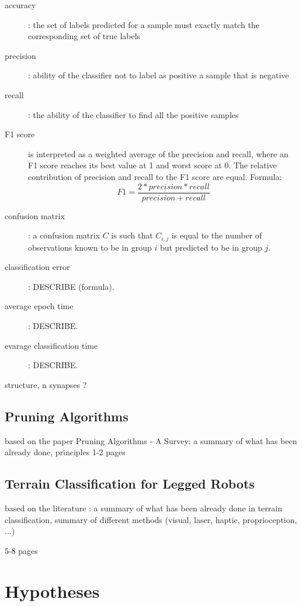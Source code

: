 \begin{description}
\item[accuracy] : the set of labels predicted for a sample must exactly match the corresponding set of true labels
\item[precision] : ability of the classifier not to label as positive a sample that is negative
\item[recall] : the ability of the classifier to find all the positive samples
\item[F1 score] is interpreted as a weighted average of the precision and recall, where an F1 score reaches its best value at 1 and worst score at 0. The relative contribution of precision and recall to the F1 score are equal. Formula:
\begin{equation} \label{eq:f1_score}
F1 = \frac{2 * precision * recall}{precision + recall}
\end{equation}
\item[confusion matrix] : a confusion matrix $ C $ is such that $ C_{i, j} $ is equal to the number of observations known to be in group $ i $ but predicted to be in group $ j $.
\item[classification error] : DESCRIBE (formula).
\item[average epoch time] : DESCRIBE.
\item[evarage classification time] : DESCRIBE.
\end{description}

structure, n synapses ?

\newpage
\subsection{Pruning Algorithms} \label{sec:soa_pruning_algorithms}

based on the paper Pruning Algorithms - A Survey: a summary of what has been already done, principles 
1-2 pages

\subsection{Terrain Classification for Legged Robots} \label{sec:soa_terrain_classification}

based on the literature : a summary of what has been already done in terrain classification, summary of different methods (visual, laser, haptic, proprioception, ...)

5-8 pages 

\section{Hypotheses}

